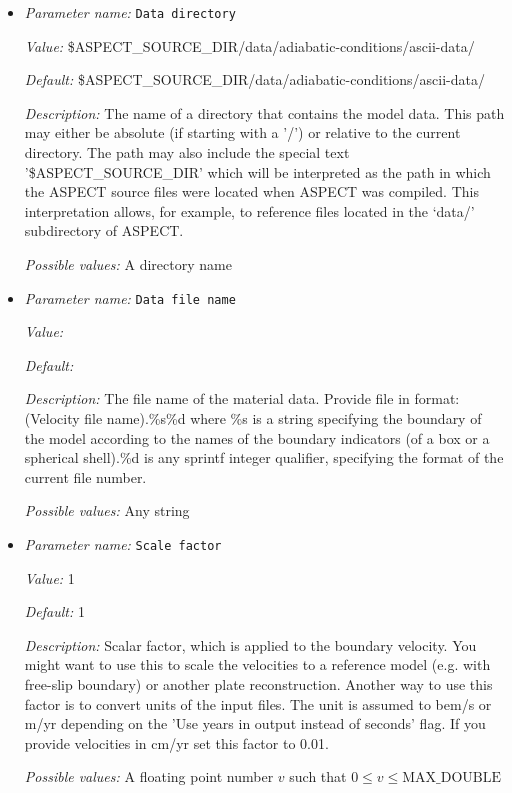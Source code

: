 \begin{itemize}
\item {\it Parameter name:} {\tt Data directory}
\label{parameters:Material model/Ascii reference profile/Ascii data model/Data directory}


{\it Value:} \$ASPECT\_SOURCE\_DIR/data/adiabatic-conditions/ascii-data/


{\it Default:} \$ASPECT\_SOURCE\_DIR/data/adiabatic-conditions/ascii-data/


{\it Description:} The name of a directory that contains the model data. This path may either be absolute (if starting with a '/') or relative to the current directory. The path may also include the special text '\$ASPECT\_SOURCE\_DIR' which will be interpreted as the path in which the ASPECT source files were located when ASPECT was compiled. This interpretation allows, for example, to reference files located in the `data/' subdirectory of ASPECT. 


{\it Possible values:} A directory name
\item {\it Parameter name:} {\tt Data file name}
\label{parameters:Material model/Ascii reference profile/Ascii data model/Data file name}


{\it Value:} 


{\it Default:} 


{\it Description:} The file name of the material data. Provide file in format: (Velocity file name).\%s\%d where \%s is a string specifying the boundary of the model according to the names of the boundary indicators (of a box or a spherical shell).\%d is any sprintf integer qualifier, specifying the format of the current file number. 


{\it Possible values:} Any string
\item {\it Parameter name:} {\tt Scale factor}
\label{parameters:Material model/Ascii reference profile/Ascii data model/Scale factor}


{\it Value:} 1


{\it Default:} 1


{\it Description:} Scalar factor, which is applied to the boundary velocity. You might want to use this to scale the velocities to a reference model (e.g. with free-slip boundary) or another plate reconstruction. Another way to use this factor is to convert units of the input files. The unit is assumed to bem/s or m/yr depending on the 'Use years in output instead of seconds' flag. If you provide velocities in cm/yr set this factor to 0.01.


{\it Possible values:} A floating point number $v$ such that $0 \leq v \leq \text{MAX\_DOUBLE}$
\end{itemize}

